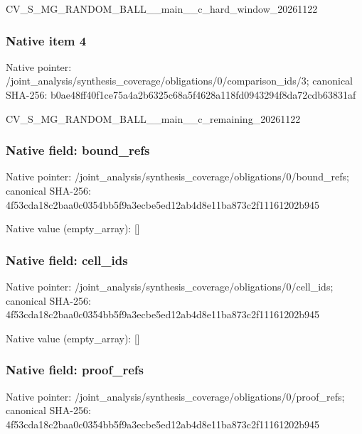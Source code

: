 \documentclass[10pt,a4paper]{article}
\begin{document}
CV\_S\_MG\_RANDOM\_BALL\_\_mai\allowbreak{}n\_\_c\_hard\_window\_2026112\allowbreak{}2


\subsubsection{Native item 4}


Native pointer: /joint\_analysis/synthesi\allowbreak{}s\_coverage/obligations/0\allowbreak{}/comparison\_ids/3; canonical SHA-256: b0ae48ff40f1ce75a4a2b632\allowbreak{}5c68a5f4628a118fd0943294\allowbreak{}f8da72cdb63831af


CV\_S\_MG\_RANDOM\_BALL\_\_mai\allowbreak{}n\_\_c\_remaining\_20261122


\subsubsection{Native field: bound\_refs}


Native pointer: /joint\_analysis/synthesi\allowbreak{}s\_coverage/obligations/0\allowbreak{}/bound\_refs; canonical SHA-256: 4f53cda18c2baa0c0354bb5f\allowbreak{}9a3ecbe5ed12ab4d8e11ba87\allowbreak{}3c2f11161202b945



Native value (empty\_array): []



\subsubsection{Native field: cell\_ids}


Native pointer: /joint\_analysis/synthesi\allowbreak{}s\_coverage/obligations/0\allowbreak{}/cell\_ids; canonical SHA-256: 4f53cda18c2baa0c0354bb5f\allowbreak{}9a3ecbe5ed12ab4d8e11ba87\allowbreak{}3c2f11161202b945



Native value (empty\_array): []



\subsubsection{Native field: proof\_refs}


Native pointer: /joint\_analysis/synthesi\allowbreak{}s\_coverage/obligations/0\allowbreak{}/proof\_refs; canonical SHA-256: 4f53cda18c2baa0c0354bb5f\allowbreak{}9a3ecbe5ed12ab4d8e11ba87\allowbreak{}3c2f11161202b945
\end{document}
